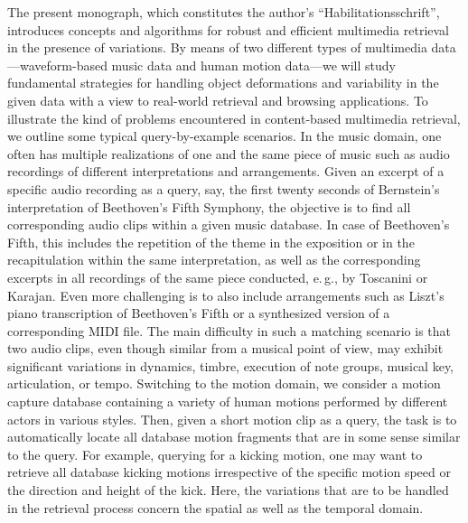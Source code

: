 The present monograph, which constitutes the author's ``Habilitationsschrift'',
introduces concepts and algorithms for robust and efficient
multimedia retrieval in the presence of variations.
By means of two different types of multimedia data---waveform-based
music data and human motion data---we will study %
fundamental strategies for handling object deformations and
variability in the given data with a view to real-world retrieval and browsing applications.
To illustrate the kind of problems encountered in content-based multimedia retrieval, %
we outline some typical query-by-example scenarios.
In the music domain, one often has multiple realizations of one
and the same piece of music such as audio recordings
of different interpretations and arrangements.
Given an excerpt of a specific audio recording as a query,
say, the first twenty
seconds of Bernstein's interpretation of Beethoven's Fifth Symphony,
the objective is to find all corresponding audio clips within
a given music database. In case of Beethoven's Fifth,
this includes the repetition of the theme in the exposition or in
the recapitulation within the same interpretation, as well as the
corresponding excerpts in all recordings of the same piece
conducted, e.\,g., by Toscanini or Karajan.
Even more challenging is to also include arrangements
such as Liszt's piano transcription of Beethoven's Fifth
or a synthesized version of a corresponding MIDI file.
The main difficulty in such a matching scenario
is that two audio clips, even though similar
from a musical point of view,  may exhibit significant variations
in dynamics, timbre, execution of note groups,
musical key, articulation, or tempo.
Switching to the motion domain, we consider a motion capture database
containing a variety of human motions performed by different
actors in various styles. Then, given a short motion clip
as a query, the task is to automatically locate all
database motion fragments that are in some sense similar to the query.
For example, querying for a kicking motion, %
one may want to retrieve all database kicking motions irrespective of
the specific motion speed or the direction and height of the kick.
Here, the variations that are to be handled in the retrieval process
concern the spatial as well as the temporal domain.

